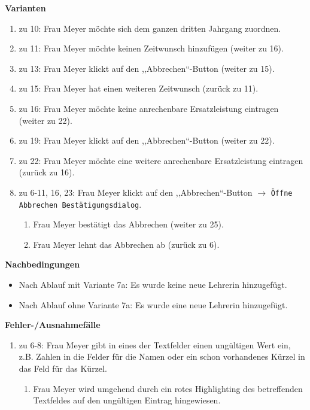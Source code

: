 \documentclass[fontsize=12pt,paper=a4,twoside]{scrartcl}
\begin{document}
\textbf{Varianten}
\begin{enumerate}
\item zu 10: Frau Meyer möchte sich dem ganzen dritten Jahrgang zuordnen.
\item zu 11: Frau Meyer möchte keinen Zeitwunsch hinzufügen (weiter zu 16).
\item zu 13: Frau Meyer klickt auf den ,,Abbrechen``-Button (weiter zu 15).
\item zu 15: Frau Meyer hat einen weiteren Zeitwunsch (zurück zu 11).
\item zu 16: Frau Meyer möchte keine anrechenbare Ersatzleistung eintragen (weiter zu 22).
\item zu 19: Frau Meyer klickt auf den ,,Abbrechen``-Button (weiter zu 22).
\item zu 22: Frau Meyer möchte eine weitere anrechenbare Ersatzleistung eintragen (zurück zu 16).
\item zu 6-11, 16, 23: Frau Meyer klickt auf den ,,Abbrechen``-Button $\rightarrow$ \texttt{Öffne Abbrechen Bestätigungsdialog}.
	\begin{enumerate}[label={\alph*.}]
	\item Frau Meyer bestätigt das Abbrechen (weiter zu 25).
	\item Frau Meyer lehnt das Abbrechen ab (zurück zu 6).
	\end{enumerate}
\end{enumerate}
\vspace{5pt}


\textbf{Nachbedingungen}
\begin{itemize}
\item Nach Ablauf mit Variante 7a: Es wurde keine neue Lehrerin hinzugefügt.
\item Nach Ablauf ohne Variante 7a: Es wurde eine neue Lehrerin hinzugefügt.
\end{itemize}
\vspace{5pt}

\textbf{Fehler-/Ausnahmefälle}
\begin{enumerate}
\item zu 6-8: Frau Meyer gibt in eines der Textfelder einen ungültigen Wert ein, z.B. Zahlen in die Felder für die Namen oder ein schon vorhandenes Kürzel in das Feld für das Kürzel.
	\begin{enumerate}[label=\arabic*.]
	\item Frau Meyer wird umgehend durch ein rotes Highlighting des betreffenden Textfeldes auf den ungültigen Eintrag hingewiesen.
	\end{enumerate}
\end{enumerate}
\end{document}
